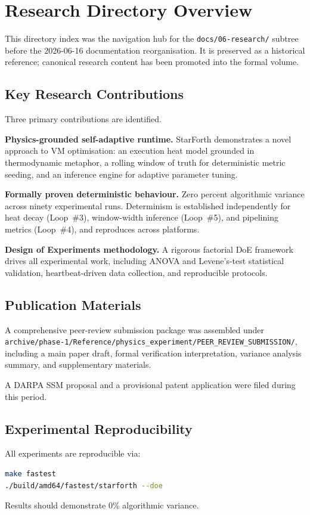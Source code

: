 
\section{Research Directory Overview}

This directory index was the navigation hub for the \texttt{docs/06-research/}
subtree before the 2026-06-16 documentation reorganisation. It is preserved
as a historical reference; canonical research content has been promoted into
the formal volume.

\subsection{Key Research Contributions}

Three primary contributions are identified.

\textbf{Physics-grounded self-adaptive runtime.}
StarForth demonstrates a novel approach to VM optimisation: an execution
heat model grounded in thermodynamic metaphor, a rolling window of truth
for deterministic metric seeding, and an inference engine for adaptive
parameter tuning.

\textbf{Formally proven deterministic behaviour.}
Zero percent algorithmic variance across ninety experimental runs.
Determinism is established independently for heat decay (Loop~\#3),
window-width inference (Loop~\#5), and pipelining metrics (Loop~\#4),
and reproduces across platforms.

\textbf{Design of Experiments methodology.}
A rigorous factorial DoE framework drives all experimental work, including
ANOVA and Levene's-test statistical validation, heartbeat-driven data
collection, and reproducible protocols.

\subsection{Publication Materials}

A comprehensive peer-review submission package was assembled under
\texttt{archive/phase-1/Reference/physics\_experiment/PEER\_REVIEW\_SUBMISSION/},
including a main paper draft, formal verification interpretation, variance
analysis summary, and supplementary materials.

A DARPA SSM proposal and a provisional patent application were filed during
this period.

\subsection{Experimental Reproducibility}

All experiments are reproducible via:

\begin{lstlisting}[language=bash]
make fastest
./build/amd64/fastest/starforth --doe
\end{lstlisting}

Results should demonstrate 0\% algorithmic variance.

